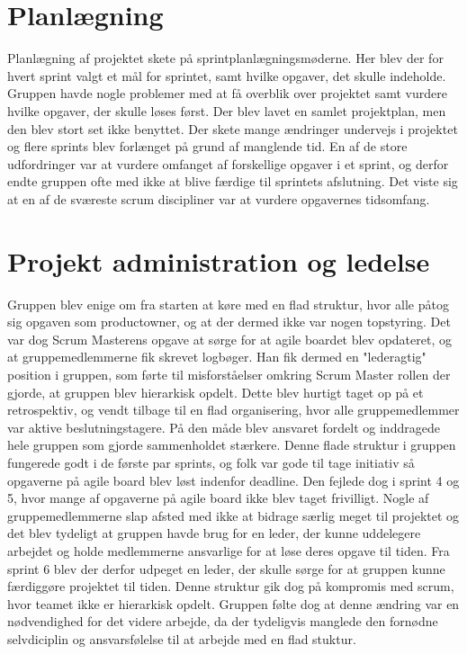 \section{Planlægning}
Planlægning af projektet skete på sprintplanlægningsmøderne. Her blev der for hvert sprint valgt et mål for sprintet, samt hvilke opgaver, det skulle indeholde.
Gruppen havde nogle problemer med at få overblik over projektet samt vurdere hvilke opgaver, der skulle løses først. Der blev lavet en samlet projektplan,
men den blev stort set ikke benyttet.
Der skete mange ændringer undervejs i projektet og flere sprints blev forlænget på grund af manglende tid. En af de store udfordringer var at vurdere omfanget
af forskellige opgaver i et sprint, og derfor endte gruppen ofte med ikke at blive færdige til sprintets afslutning. Det viste sig at en af de sværeste
scrum discipliner var at vurdere opgavernes tidsomfang. 

\section{Projekt administration og ledelse}
Gruppen blev enige om fra starten at køre med en flad struktur, hvor alle påtog sig opgaven som productowner, og at der dermed ikke var nogen topstyring.  
Det var dog Scrum Masterens opgave at sørge for at agile boardet blev opdateret, og at gruppemedlemmerne fik skrevet logbøger. Han fik dermed en "lederagtig"
position i gruppen, som førte til misforståelser omkring Scrum Master rollen der gjorde, at gruppen blev hierarkisk opdelt. Dette blev hurtigt taget op på et 
retrospektiv, og vendt tilbage til en flad organisering, hvor alle gruppemedlemmer var aktive beslutningstagere. På den måde blev ansvaret fordelt og inddragede hele gruppen 
som gjorde sammenholdet stærkere. Denne flade struktur i gruppen fungerede godt i de første par sprints, og folk var gode til tage initiativ så opgaverne på
agile board blev løst indenfor deadline. Den fejlede dog i sprint 4 og 5, hvor mange af opgaverne på agile board ikke blev taget frivilligt. Nogle af gruppemedlemmerne
slap afsted med ikke at bidrage særlig meget til projektet og det blev tydeligt at gruppen havde brug for en leder, der kunne uddelegere arbejdet
og holde medlemmerne ansvarlige for at løse deres opgave til tiden. Fra sprint 6 blev der derfor udpeget en leder, der skulle sørge for at gruppen kunne 
færdiggøre projektet til tiden. Denne struktur gik dog på kompromis med scrum, hvor teamet ikke er hierarkisk opdelt. Gruppen følte dog at denne ændring var en
nødvendighed for det videre arbejde, da der tydeligvis manglede den fornødne selvdiciplin og ansvarsfølelse til at arbejde med en flad stuktur.

